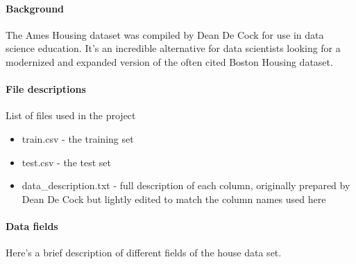 \documentclass[]{article}
\providecommand{\tightlist}{%
  \setlength{\itemsep}{0pt}\setlength{\parskip}{0pt}}
\let\oldparagraph\paragraph
\renewcommand{\paragraph}[1]{\oldparagraph{#1}\mbox{}}
\begin{document}
\paragraph{Background}\label{background}

The Ames Housing dataset was compiled by Dean De Cock for use in data
science education. It's an incredible alternative for data scientists
looking for a modernized and expanded version of the often cited Boston
Housing dataset.

\paragraph{File descriptions}\label{file-descriptions}

List of files used in the project

\begin{itemize}
\tightlist
\item
  train.csv - the training set
\item
  test.csv - the test set
\item
  data\_description.txt - full description of each column, originally
  prepared by Dean De Cock but lightly edited to match the column names
  used here
\end{itemize}

\paragraph{Data fields}\label{data-fields}

Here's a brief description of different fields of the house data set.
\end{document}
